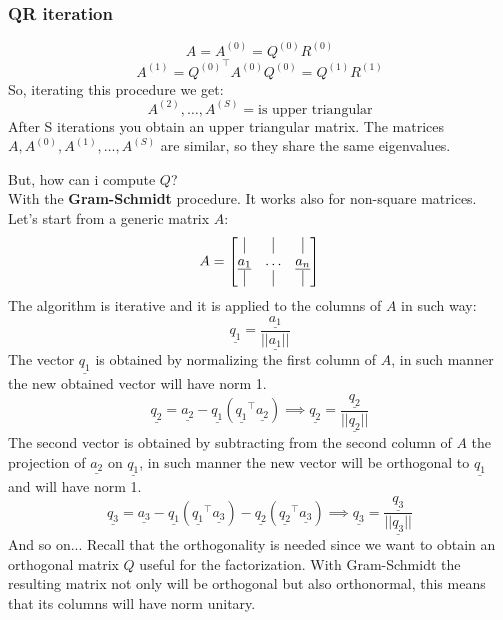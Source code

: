 \subsubsection{QR iteration} 
\[
    A = A^{(0)} = Q^{(0)}R^{(0)}     
\]
\[
    A^{(1)} = {Q^{(0)}}^{\intercal} A^{(0)} Q^{(0)} = Q^{(1)} R^{(1)}    
\]
So, iterating this procedure we get:
\[
    A^{(2)}, \dots, A^{(S)} = \text{is upper triangular}
\]
After S iterations you obtain an upper triangular matrix. The matrices $A, A^{(0)}, A^{(1)}, \dots, A^{(S)}$ are similar, so they share the same eigenvalues.

But, how can i compute $Q$?\\
With the \textbf{Gram-Schmidt} procedure. It works also for non-square matrices.\\
Let's start from a generic matrix $A$:
\[
    A = \begin{bmatrix}
        \vline & \vline & \vline\\
        \underline{a_1} & \ldots & \underline{a_n}\\
        \vline & \vline & \vline
    \end{bmatrix} 
\]
The algorithm is iterative and it is applied to the columns of $A$ in such way:
\[
  \underline{q_1} = \frac{\underline{a_1}}{||\underline{a_1}||}  
\]
The vector $\underline{q_1}$ is obtained by normalizing the first column of $A$, in such manner the new obtained vector will have norm 1.
\[
    \underline{q_2} = \underline{a_2} - \underline{q_1}(\underline{q_1}^\intercal \underline{a_2}) \implies \underline{q_2} = \dfrac{\underline{q_2}}{||\underline{q_2}||}
\]
The second vector is obtained by subtracting from the second column of $A$ the projection of $\underline{a_2}$ on $\underline{q_1}$, in such manner the new vector will be orthogonal to $\underline{q_1}$ and will have norm 1.
\[
    \underline{q_3} = \underline{a_3} - \underline{q_1}(\underline{q_1}^\intercal \underline{a_3}) - \underline{q_2}(\underline{q_2}^\intercal \underline{a_3}) \implies \underline{q_3} = \dfrac{\underline{q_3}}{||\underline{q_3}||}
\]
And so on... Recall that the orthogonality is needed since we want to obtain an orthogonal matrix $Q$ useful for the factorization. With Gram-Schmidt the resulting matrix not only will be orthogonal but also orthonormal, this means that its columns will have norm unitary.\\  
